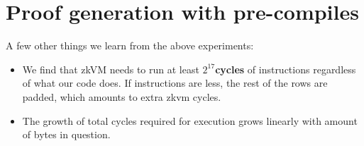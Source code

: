 \section{Proof generation with pre-compiles}

A few other things we learn from the above experiments:
\begin{itemize}
    \item We find that zkVM needs to run at least \textbf{$2^{17}$}\textbf{cycles} of instructions regardless of what our code does. If instructions are less, the rest of the rows are padded, which amounts to extra zkvm cycles.
    \item The growth of total cycles required for execution grows linearly with amount of bytes in question.
\end{itemize}